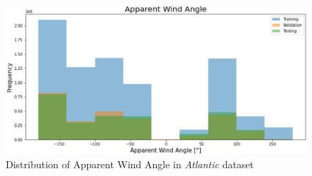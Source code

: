 \begin{figure}[h]
\centering
\includegraphics[width = \hsize]{figures/distributions/atlantic-AWA.png}
\caption{Distribution of Apparent Wind Angle in \textit{Atlantic} dataset \cite{charles}}
\label{fig:atlantic-tws}
\end{figure}

